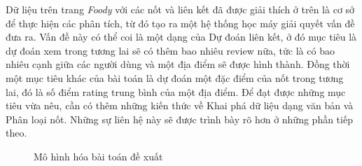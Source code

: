 \documentclass[12pt]{extarticle}
\begin{document}
			\par Dữ liệu trên trang \textit{Foody}  với các nốt và liên kết đã được giải thích ở trên là cơ sở để thực hiện các phân tích, từ đó tạo ra một hệ thống học máy giải quyết vấn đề đưa ra. Vấn đề này có thể coi là một dạng của Dự đoán liên kết, ở đó mục tiêu là dự đoán xem trong tương lai sẽ có thêm bao nhiêu review nữa, tức là có bao nhiêu cạnh giữa các người dùng và một địa điểm sẽ được hình thành. Đồng thời một mục tiêu khác của bài toán là dự đoán một đặc điểm của nốt trong tương lai, đó là số điểm rating trung bình của một địa điểm. Để đạt được những mục tiêu vừa nêu, cần có thêm những kiến thức về Khai phá dữ liệu dạng văn bản và Phân loại nốt. Những sự liên hệ này sẽ được trình bày rõ hơn ở những phần tiếp theo.

			\begin{figure}[h!]

				\caption{Mô hình hóa bài toán đề xuất}
				\label{fig:problem}
			\end{figure} 
\end{document}
